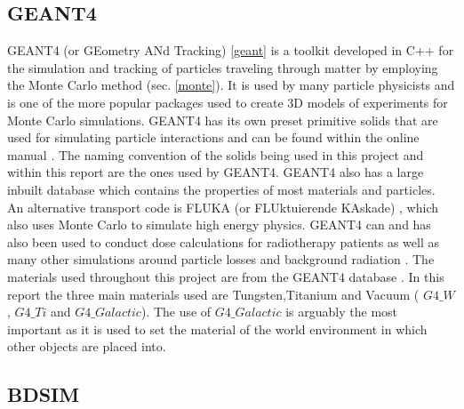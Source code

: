 \documentclass[12pt,a4paper]{article}
\begin{document}

\subsection{GEANT4}\label{GEANT4}
\label{g4}
GEANT4 (or GEometry ANd Tracking) \ref{geant} is a toolkit developed in C++ for the simulation and tracking of particles traveling through matter by employing the Monte Carlo method (sec. \ref{monte}). It is used by many particle physicists and is one of the more popular packages used to create 3D models of experiments for Monte Carlo simulations. GEANT4 has its own preset primitive solids that are used for simulating particle interactions and can be found within the online manual \cite{solids}. The naming convention of the solids being used in this project and within this report are the ones used by GEANT4. GEANT4 also has a large inbuilt database which contains the properties of most materials and particles. An alternative transport code is FLUKA (or FLUktuierende KAskade) \cite{fluka}, which also uses Monte Carlo to simulate high energy physics. GEANT4 can and has also been used to conduct dose calculations for radiotherapy patients \cite{dose} as well as many other simulations around particle losses and background radiation \cite{will}. The materials used throughout this project are from the GEANT4 database \cite{mater}. In this report the three main materials used are Tungsten,Titanium and Vacuum ( $G4\_W$, $G4\_Ti$ and $G4\_Galactic$). The use of $G4\_Galactic$ is arguably the most important as it is used to set the material of the world environment in which other objects are placed into.


\subsection{BDSIM}
\label{bdsim}
\end{document}
